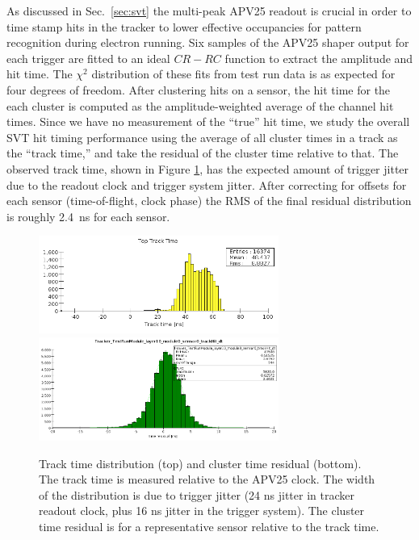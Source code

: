 



As discussed in Sec.~\ref{sec:svt} the multi-peak APV25 readout is crucial in order to time stamp
hits in the tracker to lower effective occupancies for pattern recognition during electron running. 
Six samples of the APV25 shaper output for each trigger are fitted to an ideal $CR-RC$ function to 
extract the amplitude and hit time.  The $\chi^2$ distribution of these fits from test run data is as expected
for four degrees of freedom.
After clustering hits on a sensor, the hit time for the each cluster is computed as the 
amplitude-weighted average of the channel hit times. Since we have no measurement of the ``true'' hit time, we study the overall SVT hit 
timing performance using the average of all cluster times in a track as the ``track time,'' and take the
 residual of the cluster time relative to that. The observed track time, shown in Figure \ref{fig:tracktime}, has the expected amount of trigger jitter due to the readout clock and trigger system jitter. After correcting for offsets for each sensor (time-of-flight, clock phase) the RMS 
 of the final residual distribution is roughly 2.4~ns for each sensor. 
\begin{figure}[h]
	\includegraphics[width=0.7\textwidth]{test2012/svtperformance/track_time_top}
	\includegraphics[width=0.7\textwidth]{test2012/svtperformance/timeres}
	\caption{\small{Track time distribution (top) and cluster time residual (bottom). The 
	track time is measured relative to the APV25 clock. The width of the distribution is due to 
	trigger jitter (24 ns jitter in tracker readout clock, plus 16 ns jitter in the trigger system). 
	The cluster time residual is for a representative sensor relative to the track time.}}
	\label{fig:tracktime}
\end{figure}
